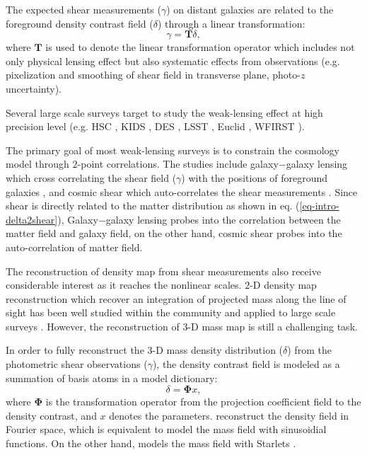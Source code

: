 \documentclass[twocolumn]{aastex62}
\begin{document}
The expected shear measurements ($\gamma$) on distant galaxies are related to the
foreground density contrast field ($\delta$) through a linear transformation:
\begin{equation} \label{eq-intro-delta2shear}
 \gamma=\mathbf{T} \delta,
\end{equation}
where $\mathbf{T}$ is used to denote the linear transformation operator which includes not only physical lensing effect
but also systematic effects from observations (e.g. pixelization and smoothing of shear field in
transverse plane, photo-$z$ uncertainty).

Several large scale surveys target to study the weak-lensing effect at high precision level (e.g. HSC \citep{HSC1-data}, KIDS
\citep{KIDS13}, DES \citep{DES05}, LSST \citep{LSSTScienceBook}, Euclid \citep{Euclid2011}, WFIRST \citep{WFIRST15}).

The primary goal of most weak-lensing surveys is to constrain the cosmology model through $2$-point correlations. The studies
include galaxy$-$galaxy lensing which cross correlating the shear field ($\gamma$) with the positions of foreground galaxies
\citep{gglens-GAMA-Han2014,gglens-BossCFHTMore2015,gglens-DES1},
and cosmic shear which auto-correlates the shear measurements
\citep{cosmicShearRealKids450,cosmicShear-DES1,cosmicShear_HSC1_Chiaki2019,cosmicShear_HSC1_Hamana2019}.
Since shear is directly related to the matter distribution as shown in eq. (\ref{eq-intro-delta2shear}), Galaxy$-$galaxy lensing
probes into the correlation between the matter field and galaxy field, on the other hand, cosmic shear probes into the
auto-correlation of matter field.

The reconstruction of density map from shear measurements also receive considerable interest as it reaches the nonlinear scales.
$2$-D density map reconstruction which recover an integration of projected mass along the line of sight has been well studied
within the community \citep{massMap-KS1993,WL-massMap-Glimpse2D-Lanusse2016,sparseBaysianMassMap-Price2020}
and applied to large scale surveys \citep{HSC1-massMaps,massMapDES-Chang2018,DES-SV-massMap-sparsity}. However, the
reconstruction of $3$-D mass map is still a challenging task.

In order to fully reconstruct the $3$-D mass density distribution ($\delta$) from the photometric shear observations ($\gamma$),
the density contrast field is modeled as a summation of basis atoms in a model dictionary:
\begin{equation} \label{eq-intro-dict}
 \delta= \mathbf{\Phi} x,
\end{equation}
where $\mathbf{\Phi}$ is the transformation operator from the projection coefficient field to the density contrast,
and $x$ denotes the parameters. \citet{LSS-massMap-Wiener-Simon2009} reconstruct the density field
in Fourier space, which is equivalent to model the mass field with sinusoidial functions. On the other hand,
\citet{LSS-massMap-Glimpse3D-Leonard2014} models the mass field with Starlets \citep{Starlet-Starck2015}.
\end{document}
